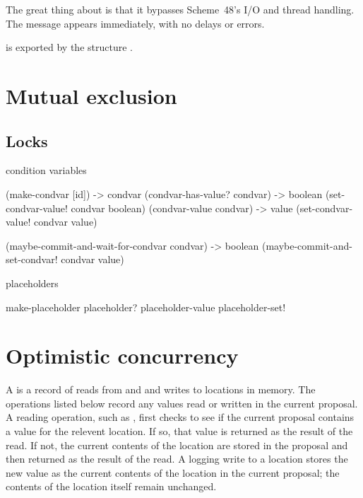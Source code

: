 The great thing about  is that it bypasses Scheme~48's
 I/O and thread handling.
The message appears immediately, with no delays or errors.

 is exported by the structure .

\section{Mutual exclusion}

\subsection{Locks}
\begin{protos}
\end{protos}


condition variables

 (make-condvar [id]) -> condvar
 (condvar-has-value? condvar) -> boolean
 (set-condvar-value! condvar boolean)
 (condvar-value condvar) -> value
 (set-condvar-value! condvar value)

 (maybe-commit-and-wait-for-condvar condvar) -> boolean
 (maybe-commit-and-set-condvar! condvar value)

placeholders

 make-placeholder
 placeholder?
 placeholder-value
 placeholder-set!

\section{Optimistic concurrency}


A  is a record of reads from and and writes to locations in
 memory.
The  operations listed below record any values read or
 written in the current proposal.
A reading operation, such as , first checks to
 see if the current proposal contains a value for the relevent location.
If so, that value is returned as the result of the read.
If not, the current contents of the location are stored in the proposal and
 then returned as the result of the read.
A logging write to a location stores the new value as the current contents of
 the location in the current proposal; the contents of the location itself
 remain unchanged.

